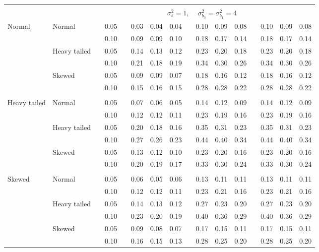 \documentclass{article} %
\begin{document}
\begin{table}[ht]
\begin{scriptsize}
\begin{center}
\begin{tabular}{ll p{.1cm} c p{.1cm} rrr p{.1cm} rrr p{.1cm} rrr}
&&&&&&&&&&&&&&&\\
& && && \multicolumn{9}{c}{$\sigma_{\varepsilon}^2 = 1$, \ \ $\sigma_{b_0}^2 = \sigma_{b_1}^2 = 4$} \\ \cline{6-16}
Normal       & Normal       && 0.05 &&  0.03 & 0.04 & 0.04 && 0.10 & 0.09 & 0.08 && 0.10 & 0.09 & 0.08 \\ 
             &              && 0.10 &&  0.09 & 0.09 & 0.10 && 0.18 & 0.17 & 0.14 && 0.18 & 0.17 & 0.14 \\ 
             & Heavy tailed && 0.05 &&  0.14 & 0.13 & 0.12 && 0.23 & 0.20 & 0.18 && 0.23 & 0.20 & 0.18 \\ 
             &              && 0.10 &&  0.21 & 0.18 & 0.19 && 0.34 & 0.30 & 0.26 && 0.34 & 0.30 & 0.26 \\ 
             & Skewed       && 0.05 &&  0.09 & 0.09 & 0.07 && 0.18 & 0.16 & 0.12 && 0.18 & 0.16 & 0.12 \\ 
             &              && 0.10 &&  0.15 & 0.16 & 0.15 && 0.28 & 0.28 & 0.22 && 0.28 & 0.28 & 0.22 \\
             &&&&&&&&&&&&&&&\\ 
Heavy tailed & Normal       && 0.05 &&  0.07 & 0.06 & 0.05 && 0.14 & 0.12 & 0.09 && 0.14 & 0.12 & 0.09 \\ 
             &              && 0.10 &&  0.12 & 0.12 & 0.11 && 0.23 & 0.19 & 0.16 && 0.23 & 0.19 & 0.16 \\ 
             & Heavy tailed && 0.05 &&  0.20 & 0.18 & 0.16 && 0.35 & 0.31 & 0.23 && 0.35 & 0.31 & 0.23 \\ 
             &              && 0.10 &&  0.27 & 0.26 & 0.23 && 0.44 & 0.40 & 0.34 && 0.44 & 0.40 & 0.34 \\ 
             & Skewed       && 0.05 &&  0.13 & 0.12 & 0.10 && 0.23 & 0.20 & 0.16 && 0.23 & 0.20 & 0.16 \\ 
             &              && 0.10 &&  0.20 & 0.19 & 0.17 && 0.33 & 0.30 & 0.24 && 0.33 & 0.30 & 0.24 \\ 
             &&&&&&&&&&&&&&&\\
Skewed       & Normal       && 0.05 &&  0.06 & 0.05 & 0.06 && 0.13 & 0.11 & 0.11 && 0.13 & 0.11 & 0.11 \\ 
             &              && 0.10 &&  0.12 & 0.12 & 0.11 && 0.23 & 0.21 & 0.16 && 0.23 & 0.21 & 0.16 \\ 
             & Heavy tailed && 0.05 &&  0.14 & 0.13 & 0.12 && 0.27 & 0.23 & 0.20 && 0.27 & 0.23 & 0.20 \\ 
             &              && 0.10 &&  0.23 & 0.20 & 0.19 && 0.40 & 0.36 & 0.29 && 0.40 & 0.36 & 0.29 \\ 
             & Skewed       && 0.05 &&  0.09 & 0.08 & 0.07 && 0.17 & 0.15 & 0.11 && 0.17 & 0.15 & 0.11 \\ 
             &              && 0.10 &&  0.16 & 0.15 & 0.13 && 0.28 & 0.25 & 0.20 && 0.28 & 0.25 & 0.20 \\ 



\end{tabular}
\end{center}
\end{scriptsize}
\end{table}
\end{document}
